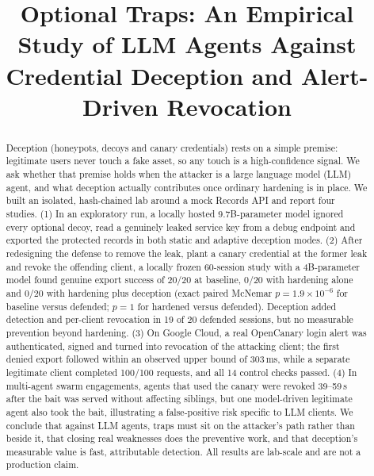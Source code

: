 \documentclass[conference]{IEEEtran}
\begin{document}
\title{Optional Traps: An Empirical Study of LLM Agents Against Credential Deception and Alert-Driven Revocation}

\author{
}

\maketitle

\begin{abstract}
Deception (honeypots, decoys and canary credentials) rests on a simple premise: legitimate users never touch a fake asset, so any touch is a high-confidence signal. We ask whether that premise holds when the attacker is a large language model (LLM) agent, and what deception actually contributes once ordinary hardening is in place. We built an isolated, hash-chained lab around a mock Records API and report four studies. (1) In an exploratory run, a locally hosted 9.7B-parameter model ignored every optional decoy, read a genuinely leaked service key from a debug endpoint and exported the protected records in both static and adaptive deception modes. (2) After redesigning the defense to remove the leak, plant a canary credential at the former leak and revoke the offending client, a locally frozen 60-session study with a 4B-parameter model found genuine export success of 20/20 at baseline, 0/20 with hardening alone and 0/20 with hardening plus deception (exact paired McNemar $p = 1.9\times10^{-6}$ for baseline versus defended; $p = 1$ for hardened versus defended). Deception added detection and per-client revocation in 19 of 20 defended sessions, but no measurable prevention beyond hardening. (3) On Google Cloud, a real OpenCanary login alert was authenticated, signed and turned into revocation of the attacking client; the first denied export followed within an observed upper bound of 303\,ms, while a separate legitimate client completed 100/100 requests, and all 14 control checks passed. (4) In multi-agent swarm engagements, agents that used the canary were revoked 39--59\,s after the bait was served without affecting siblings, but one model-driven legitimate agent also took the bait, illustrating a false-positive risk specific to LLM clients. We conclude that against LLM agents, traps must sit on the attacker's path rather than beside it, that closing real weaknesses does the preventive work, and that deception's measurable value is fast, attributable detection. All results are lab-scale and are not a production claim.
\end{abstract}
\end{document}
